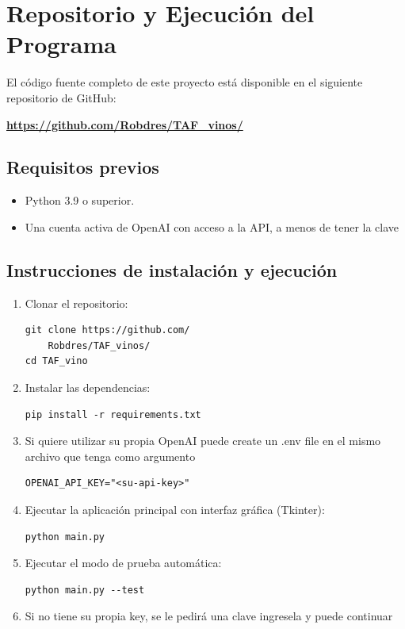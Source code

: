 \documentclass[conference]{IEEEtran}
\begin{document}
\section{Repositorio y Ejecución del Programa}

El código fuente completo de este proyecto está disponible en el siguiente repositorio de GitHub:

\begin{center}
\textbf{\url{https://github.com/Robdres/TAF_vinos/}}
\end{center}

\subsection{Requisitos previos}

\begin{itemize}
    \item Python 3.9 o superior.
    \item Una cuenta activa de OpenAI con acceso a la API, a menos de tener
        la clave
\end{itemize}

\subsection{Instrucciones de instalación y ejecución}

\begin{enumerate}
    \item Clonar el repositorio:
    \begin{verbatim}
git clone https://github.com/
    Robdres/TAF_vinos/
cd TAF_vino
    \end{verbatim}

    \item Instalar las dependencias:
    \begin{verbatim}
pip install -r requirements.txt
    \end{verbatim}

    \item Si quiere utilizar su propia OpenAI puede
        create un .env file en el mismo archivo que tenga
        como argumento
    \begin{verbatim}
OPENAI_API_KEY="<su-api-key>"
    \end{verbatim}

    \item Ejecutar la aplicación principal con interfaz gráfica (Tkinter):
    \begin{verbatim}
python main.py
    \end{verbatim}


    \item Ejecutar el modo de prueba automática:
    \begin{verbatim}
python main.py --test
    \end{verbatim}

    \item Si no tiene su propia key, se le pedirá una clave
        ingresela y puede continuar

\end{enumerate}
\end{document}
